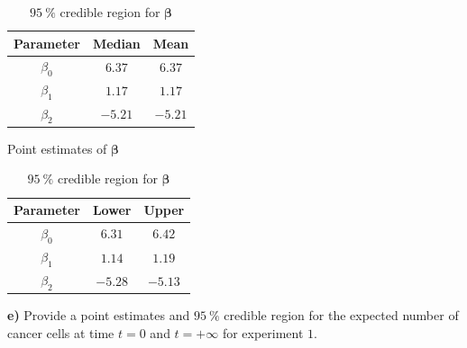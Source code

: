 \begin{table}[H]
	\parbox{0.45\linewidth}{
		\centering
		\begin{tabular}{|c|c|c|} \hline 
			Parameter & Median & Mean \\ \hline 
			$\beta_0$ & $6.37$ & $6.37$ \\ 
			$\beta_1$ & $1.17$ & $1.17$ \\
			$\beta_2$ & $-5.21$ & $-5.21$ \\ \hline
		\end{tabular}
		\caption{Point estimates of $\bm{\beta}$}
		\label{tab:metropolis-cw-point-estimates}
	}
	\hfill
	\parbox{0.45\linewidth}{
		\centering
		\begin{tabular}{|c|c|c|} \hline 
			Parameter & Lower & Upper \\ \hline 
			$\beta_0$ & $6.31$ & $6.42$ \\ 
			$\beta_1$ & $1.14$ & $1.19$ \\
			$\beta_2$ & $-5.28$ & $-5.13$ \\ \hline
		\end{tabular}
		\caption{$\SI{95}{\percent}$ credible region for $\bm{\beta}$}
		\label{tab:metropolis-cw-credible-region}
	}
\end{table}

\textbf{e)} Provide a point estimates and $\SI{95}{\percent}$ credible region for the expected number of cancer cells at time $t = 0$ and $t = +\infty$ for experiment $1$.
